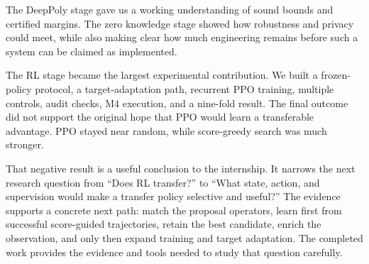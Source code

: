 \documentclass[11pt,a4paper]{report}
\begin{document}
The DeepPoly stage gave us a working understanding of sound bounds and certified margins. The zero knowledge stage showed how robustness and privacy could meet, while also making clear how much engineering remains before such a system can be claimed as implemented.

The RL stage became the largest experimental contribution. We built a frozen-policy protocol, a target-adaptation path, recurrent PPO training, multiple controls, audit checks, M4 execution, and a nine-fold result. The final outcome did not support the original hope that PPO would learn a transferable advantage. PPO stayed near random, while score-greedy search was much stronger.

That negative result is a useful conclusion to the internship. It narrows the next research question from ``Does RL transfer?'' to ``What state, action, and supervision would make a transfer policy selective and useful?'' The evidence supports a concrete next path: match the proposal operators, learn first from successful score-guided trajectories, retain the best candidate, enrich the observation, and only then expand training and target adaptation. The completed work provides the evidence and tools needed to study that question carefully.
\end{document}
